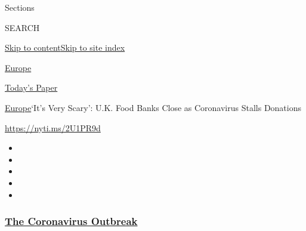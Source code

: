 Sections

SEARCH

\protect\hyperlink{site-content}{Skip to
content}\protect\hyperlink{site-index}{Skip to site index}

\href{https://www.nytimes3xbfgragh.onion/section/world/europe}{Europe}

\href{https://myaccount.nytimes3xbfgragh.onion/auth/login?response_type=cookie\&client_id=vi}{}

\href{https://www.nytimes3xbfgragh.onion/section/todayspaper}{Today's
Paper}

\href{/section/world/europe}{Europe}\textbar{}`It's Very Scary': U.K.
Food Banks Close as Coronavirus Stalls Donations

\url{https://nyti.ms/2U1PR9d}

\begin{itemize}
\item
\item
\item
\item
\item
\end{itemize}

\hypertarget{the-coronavirus-outbreak}{%
\subsubsection{\texorpdfstring{\href{https://www.nytimes3xbfgragh.onion/news-event/coronavirus?name=styln-coronavirus-national\&region=TOP_BANNER\&block=storyline_menu_recirc\&action=click\&pgtype=Article\&impression_id=5fac1cf0-f52d-11ea-864d-454cfeeecf0d\&variant=undefined}{The
Coronavirus
Outbreak}}{The Coronavirus Outbreak}}\label{the-coronavirus-outbreak}}

